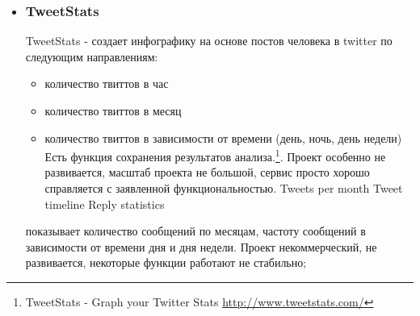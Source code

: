 \begin{itemize}
	\begin{itemize}
	\item Широкий охват поиска. Порядка 700 000 отслеживаемых площадок, постоянно добавляются новые источники, в т.ч. по запросу пользователя
	\item Фильтрация спама, точность выборки. Система учитывает только те отзывы, которые относятся к объекту мониторинга, отсеивает спам и сообщения, в которых бренд упомянут вскользь.
	\item Автоматическое определение тональности и тематики сообщений
	\item собственная лингвистическая технология, которая позволяет системе «понимать» правила построения предложений, анализировать связи между словами и автоматически определять тональность высказывания (хорошо, плохо, нейтрально) относительно объекта мониторинга с точностью более 80%
	\item Оперативность обновления данных. Данные попадают в систему в период от 15 минут до 2-4 часов после публикации.
	\item Система позволяет определить общий охват, а также «вес» каждого упоминания и его автора, что особенно важно для формирования эффективной информационной политики, выбора подходящих площадок взаимодействия с аудиторией и выявления лидеров мнений.
Возможность реагирования
	\item Разнообразие отчетов, экспорт данных
	\item Автоматическая генерация отчетов по шаблону и рассылка по электронной почте по заданной схеме.
	\item Возможность заказать аналитический отчет у экспертов в области мониторинга социальных медиа.
	\item Ролевой доступ, система назначения заданий, журналирование действий операторов в системе\footnote{Что такое Крибрум \url{http://www.kribrum.ru/about/}}
	\end{itemize}


\item \subsubsection{TweetStats}
TweetStats - создает инфографику на основе постов человека в twitter по следующим направлениям:
	\begin{itemize}
	\item количество твиттов в час
	\item количество твиттов в месяц
	\item количество твиттов в зависимости от времени (день, ночь, день недели)
Есть функция сохранения результатов анализа.\footnote{TweetStats - Graph your Twitter Stats \url{http://www.tweetstats.com/}}. Проект особенно не развивается, масштаб проекта не большой, сервис просто хорошо справляется с заявленной функциональностью.
Tweets per month
Tweet timeline
Reply statistics
	\end{itemize}
показывает количество сообщений по месяцам, частоту сообщений в зависимости от времени дня и дня недели. Проект некоммерческий, не развивается, некоторые функции работают не стабильно;


\end{itemize}
